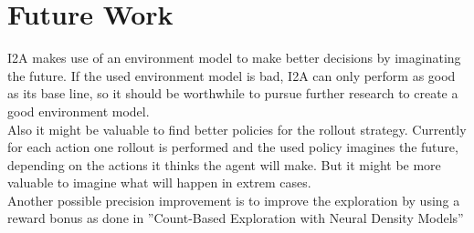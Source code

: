 \section{Future Work}

I2A makes use of an environment model to make better decisions by imaginating the future. If the used environment model is bad, I2A can only perform as good as its base line, so it should be worthwhile to pursue further research to create a good environment model.\\

Also it might be valuable to find better policies for the rollout strategy. Currently for each action one rollout is performed and the used policy imagines the future, depending on the actions it thinks the agent will make. But it might be more valuable to imagine what will happen in extrem cases.\\

Another possible precision improvement is to improve the exploration by using a reward bonus as done in ”Count-Based Exploration with Neural Density Models” \cite{CountBasedExploration}



